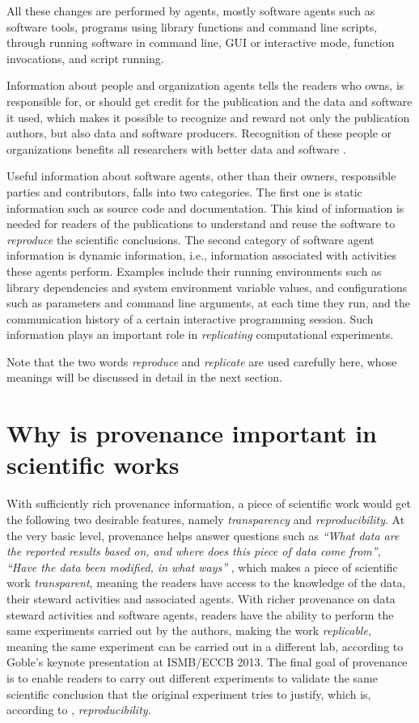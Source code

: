 All these changes are performed by agents, mostly software agents such as software tools, programs using library functions and command line scripts, through running software in command line, GUI or interactive mode, function invocations, and script running.

Information about people and organization agents tells the readers who owns, is responsible for, or should get credit for the publication and the data and software it used, which makes it possible to recognize and reward not only the publication authors, but also data and software producers. Recognition of these people or organizations benefits all researchers with better data and software \cite{parsons2010data, goble2014better}. 

Useful information about software agents, other than their owners, responsible parties and contributors, falls into two categories. The first one is static information such as source code and documentation. This kind of information is needed for readers of the publications to understand and reuse the software to \emph{reproduce} the scientific conclusions. The second category of software agent information is dynamic information, i.e., information associated with activities these agents perform. Examples include their running environments such as library dependencies and system environment variable values, and configurations such as parameters and command line arguments, at each time they run, and the communication history of a certain interactive programming session. Such information plays an important role in \emph{replicating} computational experiments.

Note that the two words \emph{reproduce} and \emph{replicate} are used carefully here, whose meanings will be discussed in detail in the next section.


\section{Why is provenance important in scientific works}
With sufficiently rich provenance information, a piece of scientific work would get the following two desirable features, namely \emph{transparency} and \emph{reproducibility}. At the very basic level, provenance helps answer questions such as \emph{``What data are the reported results based on, and where does this piece of data come from''}, \emph{``Have the data been modified, in what ways''} \cite{davidson2008provenance}, which makes a piece of scientific work \emph{transparent}, meaning the readers have access to the knowledge of the data, their steward activities and associated agents. With richer provenance on data steward activities and software agents, readers have the ability to perform the same experiments carried out by the authors, making the work \emph{replicable}, meaning the same experiment can be carried out in a different lab, according to Goble's keynote presentation at ISMB/ECCB 2013. The final goal of provenance is to enable readers to carry out different experiments to validate the same scientific conclusion that the original experiment tries to justify, which is, according to \cite{drummond2009replicability}, \emph{reproducibility}.

